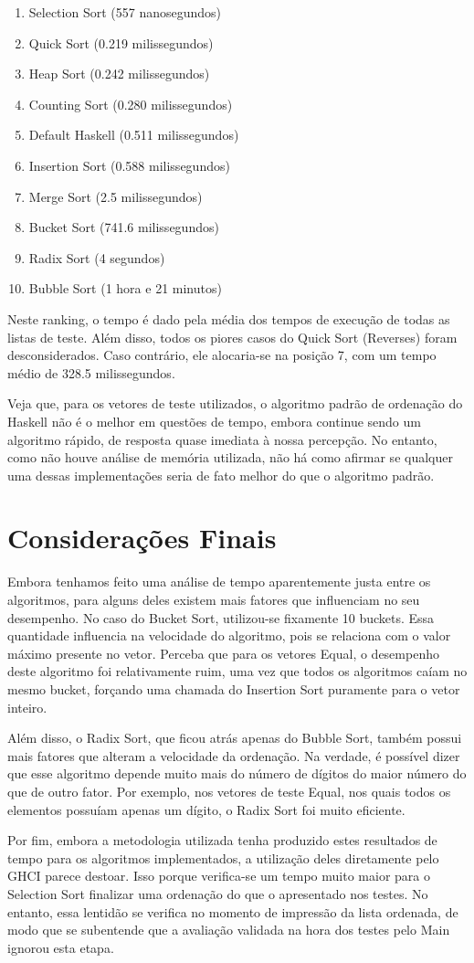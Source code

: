 \documentclass[12pt,a4paper]{article}
\begin{document}
\begin{enumerate}
\item Selection Sort (557 nanosegundos)
\item Quick Sort (0.219 milissegundos)
\item Heap Sort (0.242 milissegundos)
\item Counting Sort (0.280 milissegundos)
\item Default Haskell (0.511 milissegundos)
\item Insertion Sort (0.588 milissegundos)
\item Merge Sort (2.5 milissegundos)
\item Bucket Sort (741.6 milissegundos)
\item Radix Sort (4 segundos)
\item Bubble Sort (1 hora e 21 minutos)
\end{enumerate}

Neste ranking, o tempo é dado pela média dos tempos de execução de todas as listas de teste. Além disso, todos os piores casos do Quick Sort (Reverses) foram desconsiderados. Caso contrário, ele alocaria-se na posição 7, com um tempo médio de 328.5 milissegundos.

Veja que, para os vetores de teste utilizados, o algoritmo padrão de ordenação do Haskell não é o melhor em questões de tempo, embora continue sendo um algoritmo rápido, de resposta quase imediata à nossa percepção. No entanto, como não houve análise de memória utilizada, não há como afirmar se qualquer uma dessas implementações seria de fato melhor do que o algoritmo padrão.

\section{Considerações Finais}
Embora tenhamos feito uma análise de tempo aparentemente justa entre os algoritmos, para alguns deles existem mais fatores que influenciam no seu desempenho. No caso do Bucket Sort, utilizou-se fixamente 10 buckets. Essa quantidade influencia na velocidade do algoritmo, pois se relaciona com o valor máximo presente no vetor. Perceba que para os vetores Equal, o desempenho deste algoritmo foi relativamente ruim, uma vez que todos os algoritmos caíam no mesmo bucket, forçando uma chamada do Insertion Sort puramente para o vetor inteiro.

Além disso, o Radix Sort, que ficou atrás apenas do Bubble Sort, também possui mais fatores que alteram a velocidade da ordenação. Na verdade, é possível dizer que esse algoritmo depende muito mais do número de dígitos do maior número do que de outro fator. Por exemplo, nos vetores de teste Equal, nos quais todos os elementos possuíam apenas um dígito, o Radix Sort foi muito eficiente.

Por fim, embora a metodologia utilizada tenha produzido estes resultados de tempo para os algoritmos implementados, a utilização deles diretamente pelo GHCI parece destoar. Isso porque verifica-se um tempo muito maior para o Selection Sort finalizar uma ordenação do que o apresentado nos testes. No entanto, essa lentidão se verifica no momento de impressão da lista ordenada, de modo que se subentende que a avaliação validada na hora dos testes pelo Main ignorou esta etapa.
\end{document}
